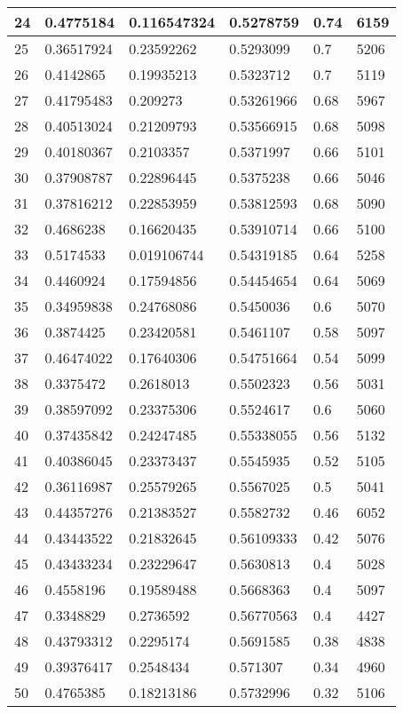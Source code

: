 \begin{longtable}{|l|l|l|l|l|l|}
24 & 0.4775184 & 0.116547324 & 0.5278759 & 0.74 & 6159 \\ \hline 
25 & 0.36517924 & 0.23592262 & 0.5293099 & 0.7 & 5206 \\ \hline 
26 & 0.4142865 & 0.19935213 & 0.5323712 & 0.7 & 5119 \\ \hline 
27 & 0.41795483 & 0.209273 & 0.53261966 & 0.68 & 5967 \\ \hline 
28 & 0.40513024 & 0.21209793 & 0.53566915 & 0.68 & 5098 \\ \hline 
29 & 0.40180367 & 0.2103357 & 0.5371997 & 0.66 & 5101 \\ \hline 
30 & 0.37908787 & 0.22896445 & 0.5375238 & 0.66 & 5046 \\ \hline 
31 & 0.37816212 & 0.22853959 & 0.53812593 & 0.68 & 5090 \\ \hline 
32 & 0.4686238 & 0.16620435 & 0.53910714 & 0.66 & 5100 \\ \hline 
33 & 0.5174533 & 0.019106744 & 0.54319185 & 0.64 & 5258 \\ \hline 
34 & 0.4460924 & 0.17594856 & 0.54454654 & 0.64 & 5069 \\ \hline 
35 & 0.34959838 & 0.24768086 & 0.5450036 & 0.6 & 5070 \\ \hline 
36 & 0.3874425 & 0.23420581 & 0.5461107 & 0.58 & 5097 \\ \hline 
37 & 0.46474022 & 0.17640306 & 0.54751664 & 0.54 & 5099 \\ \hline 
38 & 0.3375472 & 0.2618013 & 0.5502323 & 0.56 & 5031 \\ \hline 
39 & 0.38597092 & 0.23375306 & 0.5524617 & 0.6 & 5060 \\ \hline 
40 & 0.37435842 & 0.24247485 & 0.55338055 & 0.56 & 5132 \\ \hline 
41 & 0.40386045 & 0.23373437 & 0.5545935 & 0.52 & 5105 \\ \hline 
42 & 0.36116987 & 0.25579265 & 0.5567025 & 0.5 & 5041 \\ \hline 
43 & 0.44357276 & 0.21383527 & 0.5582732 & 0.46 & 6052 \\ \hline 
44 & 0.43443522 & 0.21832645 & 0.56109333 & 0.42 & 5076 \\ \hline 
45 & 0.43433234 & 0.23229647 & 0.5630813 & 0.4 & 5028 \\ \hline 
46 & 0.4558196 & 0.19589488 & 0.5668363 & 0.4 & 5097 \\ \hline 
47 & 0.3348829 & 0.2736592 & 0.56770563 & 0.4 & 4427 \\ \hline 
48 & 0.43793312 & 0.2295174 & 0.5691585 & 0.38 & 4838 \\ \hline 
49 & 0.39376417 & 0.2548434 & 0.571307 & 0.34 & 4960 \\ \hline 
50 & 0.4765385 & 0.18213186 & 0.5732996 & 0.32 & 5106 \\ \hline 
\end{longtable}